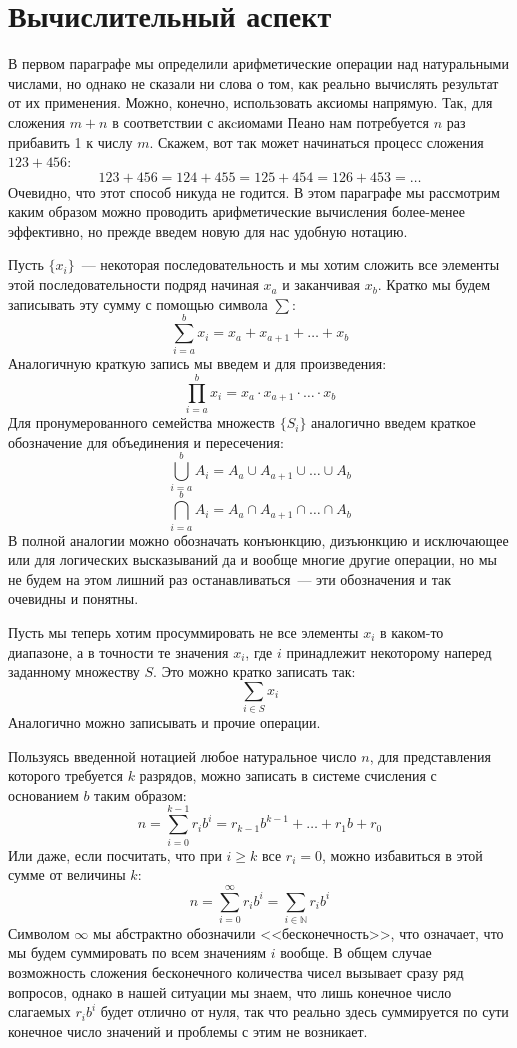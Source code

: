\section{Вычислительный аспект}

В первом параграфе мы определили арифметические операции над натуральными числами, но однако не сказали ни слова о том, как реально вычислять результат от их применения. Можно, конечно, использовать аксиомы напрямую. Так, для сложения $m+n$ в соответствии с акcиомами Пеано нам потребуется $n$ раз прибавить 1 к числу $m$. Скажем, вот так может начинаться процесс сложения $123+456$:
$$123+456 = 124 + 455 = 125 + 454 = 126 + 453 = \ldots$$
Очевидно, что этот способ никуда не годится. В этом параграфе мы рассмотрим каким образом можно проводить арифметические вычисления более-менее эффективно, но прежде введем новую для нас удобную нотацию.

Пусть $\{x_i\}$~--- некоторая последовательность и мы хотим сложить все элементы этой последовательности подряд начиная $x_a$ и заканчивая $x_b$. Кратко мы будем записывать эту сумму с помощью символа $\sum$:
$$\sum_{i=a}^b x_i = x_a + x_{a+1} + \ldots + x_b$$
Аналогичную краткую запись мы введем и для произведения:
$$\prod_{i=a}^b x_i = x_a \cdot x_{a+1} \cdot \ldots \cdot x_b$$
Для пронумерованного семейства множеств $\{S_i\}$ аналогично введем краткое обозначение для объединения и пересечения:
$$\bigcup_{i=a}^b A_i = A_a \cup A_{a+1}\cup\ldots\cup A_b$$
$$\bigcap_{i=a}^b A_i = A_a \cap A_{a+1}\cap\ldots\cap A_b$$
В полной аналогии можно обозначать конъюнкцию, дизъюнкцию и исключающее или  для логических высказываний да и вообще многие другие операции, но мы не будем на этом лишний раз останавливаться~--- эти обозначения и так очевидны и понятны.

Пусть мы теперь хотим просуммировать не все элементы $x_i$ в каком-то диапазоне, а в точности те значения $x_i$, где $i$ принадлежит некоторому наперед заданному множеству $S$. Это можно кратко записать так:
$$\sum_{i\in S} x_i$$
Аналогично можно записывать и прочие операции.

Пользуясь введенной нотацией любое натуральное число $n$, для представления которого требуется $k$ разрядов, можно записать в системе счисления с основанием $b$ таким образом:
$$n = \sum_{i=0}^{k-1} r_i b^i = r_{k - 1} b^{k-1} + \ldots + r_1 b + r_0$$
Или даже, если посчитать, что при $i\ge k$ все $r_i = 0$, можно избавиться в этой сумме от величины $k$:
$$n = \sum_{i=0}^\infty r_i b^i = \sum_{i\in\mathbb{N}} r_i b^i$$
Символом $\infty$ мы абстрактно обозначили <<бесконечность>>, что означает, что мы будем суммировать по всем значениям $i$ вообще. В общем случае возможность сложения бесконечного количества чисел вызывает сразу ряд вопросов, однако в нашей ситуации мы знаем, что лишь конечное число слагаемых $r_ib^i$ будет отлично от нуля, так что реально здесь суммируется по сути конечное число значений и проблемы с этим не возникает.

